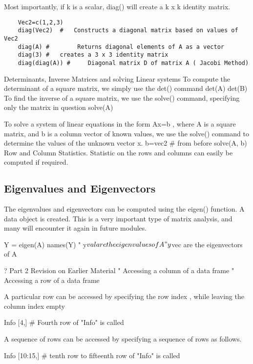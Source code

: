 Most importantly, if k is a scalar, diag() will create a k x k identity matrix.

\begin{framed}
	\begin{verbatim}
	Vec2=c(1,2,3)
	diag(Vec2)	#	Constructs a diagonal matrix based on values of Vec2
	diag(A)	#        Returns diagonal elements of A as a vector
	diag(3)	#	creates a 3 x 3 identity matrix
	diag(diag(A)) #  	Diagonal matrix D of matrix A ( Jacobi Method)
	\end{verbatim}
\end{framed}
Determinants, Inverse Matrices and solving Linear systems
To compute the determinant of a square matrix, we simply use the det() command
det(A)
det(B)
To find the inverse of a square matrix, we use the solve() command, specifying only the matrix in question
solve(A)

To solve a system of linear equations in the form Ax=b , where A is a square matrix, and b is a column vector of known values, we use the solve() command to determine the values of the unknown vector x.
b=vec2  # from before
solve(A, b)
Row and Column Statistics.
Statistic on the rows and columns can easily be computed if required.

\subsection{Eigenvalues and Eigenvectors}
The eigenvalues and eigenvectors can be computed using the eigen() function.  A data object is created.
This is a very important type of matrix analysis, and many will encounter it again in future modules.

Y = eigen(A)
names(Y)
"	y$val are the eigenvalues of A
"	y$vec are the eigenvectors of A

?
Part 2 Revision on Earlier Material
"	Accessing a column of a data frame
"	Accessing a row of a data frame

A particular row can be accessed by specifying the row index , while leaving the column index empty

Info [4,]			# Fourth row of "Info" is called

A sequence of rows can be accessed by specifying a sequence of rows as follows.

Info [10:15,]		# tenth row to fifteenth row of "Info" is called
